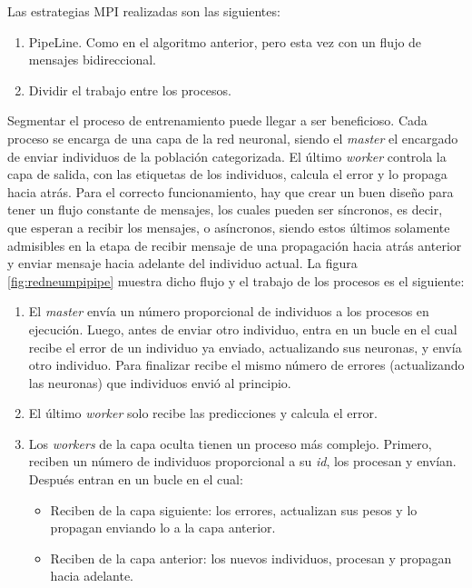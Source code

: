 	
	\noindent Las estrategias MPI realizadas son las siguientes:
	\begin{enumerate}				
		\item PipeLine. Como en el algoritmo anterior, pero esta vez con un flujo de mensajes bidireccional.
		\item Dividir el trabajo entre los procesos.
	\end{enumerate}
	
	Segmentar el proceso de entrenamiento puede llegar a ser beneficioso. Cada proceso se encarga de una capa de la red neuronal, siendo el \textit{master} el encargado de enviar individuos de la población categorizada. El último \textit{worker} controla la capa de salida, con las etiquetas de los individuos, calcula el error y lo propaga hacia atrás. Para el correcto funcionamiento, hay que crear un buen diseño para tener un flujo constante de mensajes, los cuales pueden ser síncronos, es decir, que esperan a recibir los mensajes, o asíncronos, siendo estos últimos solamente admisibles en la etapa de recibir mensaje de una propagación hacia atrás anterior y enviar mensaje hacia adelante del individuo actual. La figura \ref{fig:redneumpipipe} muestra dicho flujo y el trabajo de los procesos es el siguiente:	
	
	
	\begin{enumerate}
		\item El \textit{master} envía un número proporcional de individuos a los procesos en ejecución. Luego, antes de enviar otro individuo, entra en un bucle en el cual recibe el error de un individuo ya enviado, actualizando sus neuronas, y envía otro individuo. Para finalizar recibe el mismo número de errores (actualizando las neuronas) que individuos envió al principio.
		\item El último \textit{worker} solo recibe las predicciones y calcula el error.
		\item Los \textit{workers} de la capa oculta tienen un proceso más complejo. Primero, reciben un número de individuos proporcional a su \textit{id}, los procesan y envían. Después entran en un bucle en el cual:			
		\begin{itemize}
			\item Reciben de la capa siguiente: los errores, actualizan sus pesos y lo propagan enviando lo a la capa anterior.			
			\item Reciben de la capa anterior: los nuevos individuos, procesan y propagan hacia adelante.
		\end{itemize}		
		
	\end{enumerate}
	
